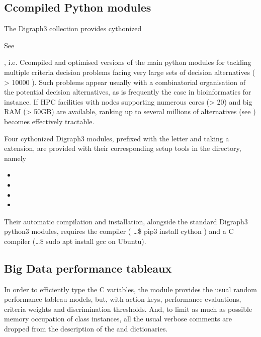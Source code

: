 \documentclass[a4paper,10pt,english]{sphinxhowto}
\begin{document}
\subsection{C\sphinxhyphen{}compiled Python modules}
\label{\detokenize{tutorial:c-compiled-python-modules}}
The Digraph3 collection provides cythonized %
\begin{footnote}[6]\sphinxAtStartFootnote
See 
%
\end{footnote}, i.e. C\sphinxhyphen{}compiled and optimised versions of the main python modules for tackling multiple criteria decision problems facing very large sets of decision alternatives ( \textgreater{} 10000 ). Such problems appear usually with a combinatorial organisation of the potential decision alternatives, as is frequently the case in bioinformatics for instance. If HPC facilities with nodes supporting numerous cores (\textgreater{} 20) and big RAM (\textgreater{} 50GB) are available, ranking up to several millions of alternatives (see ) becomes effectively tractable.

Four cythonized Digraph3 modules, prefixed with the letter  and taking a  extension, are provided with their corresponding setup tools in the  directory, namely
\begin{itemize}
\item {} 

\item {} 

\item {} 

\item {} 

\end{itemize}

Their automatic compilation and installation, alongside the standard Digraph3 python3 modules, requires the  compiler \sphinxfootnotemark[6] ( …\$ pip3 install cython ) and a C compiler (…\$ sudo apt install gcc on Ubuntu).


\subsection{Big Data performance tableaux}
\label{\detokenize{tutorial:big-data-performance-tableaux}}
In order to efficiently type the C variables, the  module provides the usual random performance tableau models, but, with  action keys,  performance evaluations,  criteria weights and  discrimination thresholds. And, to limit as much as possible memory occupation of class instances, all the usual verbose comments are dropped from the description of the  and  dictionaries.
\end{document}
